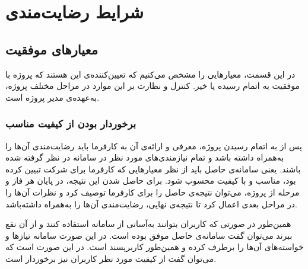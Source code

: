 


\chapter{
	شرایط رضایت‌مندی
}



\section{معیارهای موفقیت}
در این قسمت، معیارهایی را مشخص می‌کنیم که تعیین‌کننده‌ی این هستند که پروژه با موفقیت به اتمام رسیده یا خیر. کنترل و نظارت بر این موارد در مراحل مختلف پروژه، به‌عهده‌ی مدیر پروژه است.


\subsection{برخوردار بودن از کیفیت مناسب}
پس از به اتمام رسیدن پروژه، معرفی و ارائه‌ی آن به کارفرما باید رضایت‌مندی آن‌ها را به‌همراه داشته باشد و  تمام نیازمندی‌های مورد نظر در سامانه در نظر گرفته شده باشند.
یعنی سامانه‌ی حاصل باید از نظر معیارهایی که کارفرما برای شرکت تبیین کرده بود، مناسب و با کیفیت محسوب شود.
برای حاصل شدن این نتیجه، در پایان هر فاز و مرحله از پروژه، می‌توان نتیجه‌ی حاصل را برای کارفرما توصیف کرد و نظرات آن‌ها را در مراحل بعدی اعمال کرد تا نتیجه‌ی نهایی، رضایت‌مندی آن‌ها را به‌همراه داشته‌باشد.

همین‌طور در صورتی که کاربران بتوانند به‌آسانی از سامانه استفاده کنند و از آن نفع ببرند می‌توان گفت سامانه‌ی حاصل موفق بوده است. در این صورت سامانه نیاز‌ها و خواسته‌های آن‌ها را برطرف کرده و همین‌طور کاربرپسند است. در این صورت  است که می‌توان گفت از کیفیت مورد نظر کاربران نیز برخوردار است.


